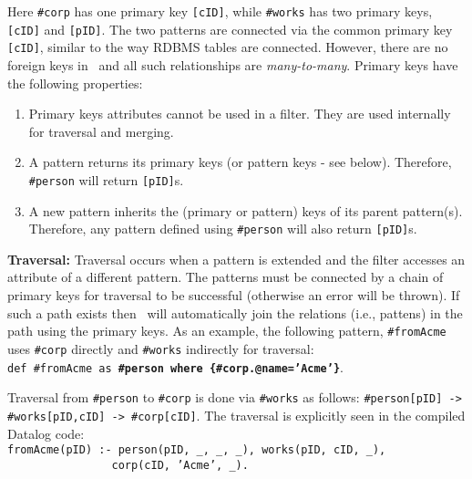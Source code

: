 Here \texttt{\#corp} has one primary key \texttt{[cID]}, while \texttt{\#works} has two primary 
 keys, \texttt{[cID]} and \texttt{[pID]}. The two patterns are connected via the common primary key \texttt{[cID]}, similar to the way RDBMS tables are connected. %
However, there are no foreign keys in \dsl~and all such relationships are {\em many-to-many}. 
Primary keys have the following properties:
\begin{enumerate}
	\item Primary keys attributes cannot be used in a filter. They are used internally for traversal and merging. %
	\item A pattern returns its primary keys (or pattern keys - see below). Therefore, \texttt{\#person} will return \texttt{[pID]}s. 
	\item A new pattern inherits the (primary or pattern) keys of its parent pattern(s). Therefore, any pattern defined using \texttt{\#person} will also return \texttt{[pID]}s. 
\end{enumerate}
%

\textbf{Traversal:} Traversal occurs when a pattern is extended and the filter accesses an attribute of a different pattern. The patterns must be connected by a chain of primary keys for traversal to be successful (otherwise an error will be thrown). If such a path exists then \dsl~will automatically join the relations (i.e., pattens) in the path using the primary keys.
As an example, the following pattern, \texttt{\#fromAcme} uses \texttt{\#corp} directly and \texttt{\#works} indirectly for traversal:\\ \colorbox{Light}{\small \texttt{def \#fromAcme as \bfseries{\#person where \{\#corp.@name='Acme'\}}}}.

 Traversal from \texttt{\#person} to \texttt{\#corp} is done via \texttt{\#works} as follows:
	{\small \texttt{\#person[pID] -> \#works[pID,cID] -> \#corp[cID]}}. 	
	The traversal is explicitly seen in the compiled Datalog code:\\	
	{\small \texttt{fromAcme(pID) :- person(pID, \_, \_, \_), works(pID, cID, \_),\\\phantom{1}~~~~~~~~~~~~~~~~corp(cID, 'Acme', \_).}}

